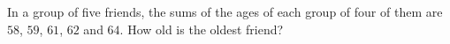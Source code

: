 In a group of five friends, the sums of the ages of each group of four of them are $58$, $59$, $61$, $62$ and $64$. How old is the oldest friend?
